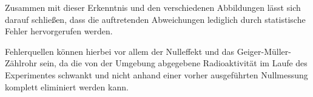 Zusammen mit dieser Erkenntnis und den verschiedenen Abbildungen lässt sich darauf
schließen, dass die auftretenden Abweichungen lediglich durch statistische Fehler
hervorgerufen werden.

Fehlerquellen können hierbei vor allem der Nulleffekt und das Geiger-Müller-Zählrohr
sein, da die von der Umgebung abgegebene Radioaktivität im Laufe des Experimentes
schwankt und nicht anhand einer vorher ausgeführten Nullmessung komplett
eliminiert werden kann.



